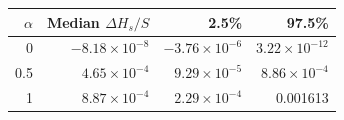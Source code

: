 \begin{tabular}{rrrr}
\toprule
$\alpha$ & Median $\Delta H_s/S$ & 2.5\% & 97.5\% \\
\midrule
0 & $-8.18\times 10^{-8}$ & $-3.76\times 10^{-6}$ & $3.22\times 10^{-12}$ \\
0.5 & $4.65\times 10^{-4}$ & $9.29\times 10^{-5}$ & $8.86\times 10^{-4}$ \\
1 & $8.87\times 10^{-4}$ & $2.29\times 10^{-4}$ & 0.001613 \\
\bottomrule
\end{tabular}
